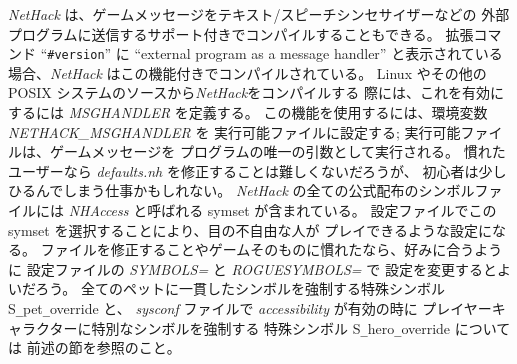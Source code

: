{\it NetHack\/} は、ゲームメッセージをテキスト/スピーチシンセサイザーなどの
外部プログラムに送信するサポート付きでコンパイルすることもできる。
拡張コマンド ``{\tt \#version}'' に
``external program as a message handler''
と表示されている場合、{\it NetHack\/} はこの機能付きでコンパイルされている。
Linux やその他の POSIX システムのソースから{\it NetHack\/}をコンパイルする
際には、これを有効にするには {\it MSGHANDLER\/} を定義する。
この機能を使用するには、環境変数 {\it NETHACK\_MSGHANDLER\/} を
実行可能ファイルに設定する; 実行可能ファイルは、ゲームメッセージを
プログラムの唯一の引数として実行される。
慣れたユーザーなら {\it defaults.nh\/} を修正することは難しくないだろうが、
初心者は少しひるんでしまう仕事かもしれない。
{\it NetHack\/} の全ての公式配布のシンボルファイルには
{\it NHAccess\/} と呼ばれる symset が含まれている。
設定ファイルでこの symset を選択することにより、目の不自由な人が
プレイできるような設定になる。
ファイルを修正することやゲームそのものに慣れたなら、好みに合うように
設定ファイルの {\it SYMBOLS=\/} と {\it ROGUESYMBOLS=\/} で
設定を変更するとよいだろう。
全てのペットに一貫したシンボルを強制する特殊シンボル
S\verb+_+pet\verb+_+override と、
{\it sysconf\/} ファイルで {\it accessibility\/} が有効の時に
プレイヤーキャラクターに特別なシンボルを強制する
特殊シンボル S\verb+_+hero\verb+_+override については
前述の節を参照のこと。

